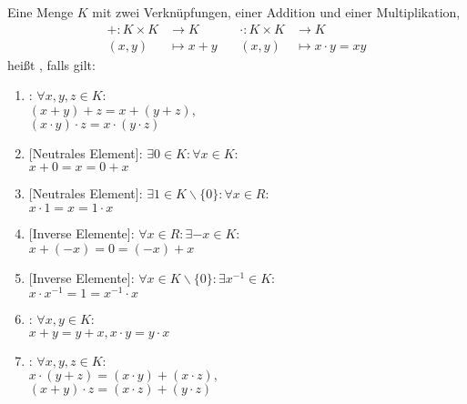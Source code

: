 Eine Menge $K$ mit zwei Verknüpfungen, einer Addition und einer Multiplikation, 
\begin{align*}
    + : K \times K & \longrightarrow K \hspace{1cm} &
    \cdot : K \times K & \longrightarrow K
    \\
    (x, y) & \longmapsto x + y &
    (x, y) & \longmapsto x \cdot y = xy
\end{align*}
heißt , falls gilt:
\begin{enumerate}[label=(K\arabic*)]
    \item {}: $\forall x, y, z \in K :$\\$(x+y)+z = x+(y+z),$\\$(x \cdot y) \cdot z = x \cdot (y \cdot z)$
    \item {}[Neutrales Element]: $\exists 0 \in K : \forall x \in K :$\\$x+0=x=0+x$
    \item {}[Neutrales Element]: $\exists 1 \in K \backslash \{0\} : \forall x \in R :$\\$x \cdot 1=x=1 \cdot x$
    \item {}[Inverse Elemente]: $\forall x \in R : \exists -x \in K :$\\$x + (-x) = 0 = (-x) + x$
    \item {}[Inverse Elemente]: $\forall x \in K \backslash \{0\} : \exists x^{-1} \in K :$\\$x \cdot x^{-1} = 1 = x^{-1} \cdot x$
    \item {}: $\forall x, y \in K :$\\$x+y=y+x, x \cdot y = y \cdot x$
    \item {}: $\forall x, y, z \in K :$\\$x \cdot (y+z) = (x \cdot y) + (x \cdot z),$\\$(x+y) \cdot z = (x \cdot z) + (y \cdot z)$
\end{enumerate}